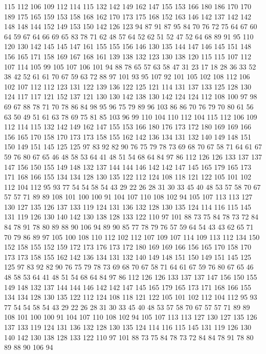 115 112 106 109 112 114 115 132 142 149 162 147 155 153 166 180 186 170 170 189
175 165 159 153 158 168 162 170 173 175 168 152 163 146 142 137 142 142 148 148
144 152 149 153 150 142 126 123 94 87 91 87 95 84 70 76 72 75 64 67
60 64 59 67 64 66 69 65 83 78 71 62 48 57 64 52 62 51 52 47
52 64 68 89 91 95 110 120 130 142 145 145 147 161 155 155 156 146 130 135
144 147 146 145 151 148 156 165 171 158 169 167 168 161 139 138 132 123 130 138
120 115 115 107 112 107 114 105 99 105 107 106 101 94 88 78 65 57 63 58
47 31 23 17 18 28 36 33 52 38 42 52 61 61 70 67 59 63 72 88
97 101 93 95 107 92 101 105 102 108 112 106 102 107 112 112 123 131 122 139
136 122 125 121 114 131 137 133 125 128 130 124 117 117 121 152 137 121 130 130
142 138 130 142 124 124 112 108 100 97 98 69 67 88 78 71 70 78 86 84
98 95 96 75 79 89 96 103 86 86 70 76 79 70 80 61 56 63 50 49
51 61 63 78 69 75 81 85 103 96 99 110 104 110 112 104 115 112 106 109
112 114 115 132 142 149 162 147 155 153 166 180 176 173 172 180 169 169 166 156
165 170 158 170 173 173 158 155 162 142 136 134 131 132 140 149 148 151 150 149
151 145 125 125 97 83 92 82 90 76 75 79 78 73 69 68 70 67 58 71
64 61 67 59 76 80 67 65 46 48 58 53 64 41 48 51 54 68 64 84
97 86 112 126 126 133 137 137 147 156 150 155 149 148 132 137 144 144 146 142
142 147 145 165 179 165 173 171 168 166 155 134 134 128 130 135 122 112 124 108
118 121 122 105 101 102 112 104 112 95 93 77 54 54 58 54 43 29 22 26
28 31 30 33 45 40 48 53 57 58 70 67 57 57 71 89 89 108 101 100
100 91 104 107 110 108 102 94 105 107 113 113 127 130 127 135 126 137 133 119
124 131 136 132 128 130 135 124 114 116 115 145 131 119 126 130 140 142 130 138
128 133 122 110 97 101 88 73 75 84 78 73 72 84 84 78 91 78 80 89
88 90 106 94 89 90 85 77 78 79 76 57 59 64 54 43 43 62 65 71
70 79 86 89 97 105 100 108 110 112 102 112 107 109 107 114 109 113 112 134
150 152 158 155 152 159 172 173 176 173 172 180 169 169 166 156 165 170 158 170
173 173 158 155 162 142 136 134 131 132 140 149 148 151 150 149 151 145 125 125
97 83 92 82 90 76 75 79 78 73 69 68 70 67 58 71 64 61 67 59
76 80 67 65 46 48 58 53 64 41 48 51 54 68 64 84 97 86 112 126
126 133 137 137 147 156 150 155 149 148 132 137 144 144 146 142 142 147 145 165
179 165 173 171 168 166 155 134 134 128 130 135 122 112 124 108 118 121 122 105
101 102 112 104 112 95 93 77 54 54 58 54 43 29 22 26 28 31 30 33
45 40 48 53 57 58 70 67 57 57 71 89 89 108 101 100 100 91 104 107
110 108 102 94 105 107 113 113 127 130 127 135 126 137 133 119 124 131 136 132
128 130 135 124 114 116 115 145 131 119 126 130 140 142 130 138 128 133 122 110
97 101 88 73 75 84 78 73 72 84 84 78 91 78 80 89 88 90 106 94
